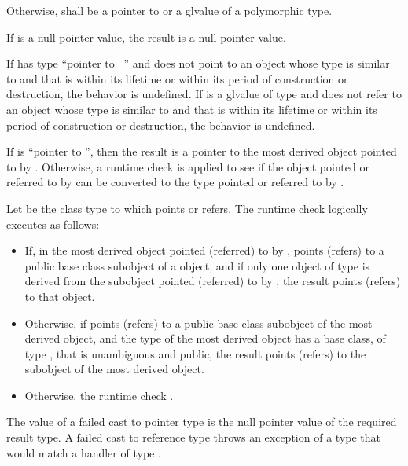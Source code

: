 \pnum
Otherwise,  shall be a pointer to or a glvalue of a polymorphic
type.

\pnum
If  is a null pointer value, the result is a null pointer value.

\pnum
If  has type ``pointer to \cv{}~'' and
 does not point to an object
whose type is similar to  and
that is
within its lifetime or
within its period of construction or destruction,
the behavior is undefined.
If  is a glvalue of type  and
 does not refer to an object
whose type is similar to  and
that is
within its lifetime or
within its period of construction or destruction,
the behavior is undefined.

\pnum
If  is ``pointer to \cv{} '', then the result
is a pointer to the most derived object pointed to by .
Otherwise, a runtime check is applied to see if the object pointed or
referred to by  can be converted to the type pointed or
referred to by .

\pnum
Let  be the class type to which  points or refers. The runtime
check logically executes as follows:

\begin{itemize}
\item If, in the most derived object pointed (referred) to by ,
 points (refers) to a public base class subobject of a
 object, and if only one object of type  is derived
from the subobject pointed (referred) to by ,
the result points (refers) to that  object.

\item Otherwise, if  points (refers) to a public base
class subobject of the most derived object, and the type of the most
derived object has a base class, of type , that is unambiguous
and public, the result points (refers) to the
 subobject of the most derived object.

\item Otherwise, the
runtime check .
\end{itemize}

\pnum
The value of a failed cast to pointer type is the null pointer value of
the required result type. A failed cast to reference type throws
an exception of a type that would match a
handler of type .

